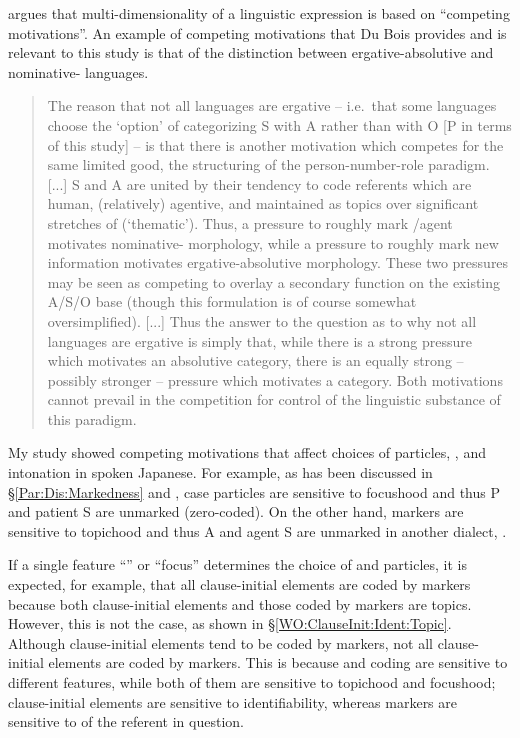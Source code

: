  argues that multi-dimensionality of a linguistic expression is based on ``competing motivations''.
An example of competing motivations that Du Bois provides and is relevant to this study is
that of the distinction between ergative-absolutive and nominative- languages.
%
\begin{quote}
The reason that not all languages are ergative -- i.e.~that some languages choose the `option' of categorizing S with A rather than with O [P in terms of this study] -- 
is that there is another motivation which competes for the same limited good,
the structuring of the person-number-role paradigm. [...]
S and A are united by their tendency to code referents which are human,
(relatively) agentive, and maintained as topics over significant stretches of  (`thematic').
Thus, a  pressure to roughly mark /agent motivates nominative- morphology,
while a  pressure to roughly mark new information motivates ergative-absolutive morphology.
These two pressures may be seen as competing to overlay a secondary function on the existing A/S/O base (though this formulation is of course somewhat oversimplified). [...]
Thus the answer to the question as to why not all languages are ergative is simply that,
while there is a strong  pressure which motivates an absolutive category, there is an equally strong -- possibly stronger --
 pressure which motivates a  category.
Both motivations cannot prevail in the competition for control of the linguistic substance of this paradigm.
\cite[354--355]{dubois85}
\end{quote}
%
My study showed competing motivations that affect
choices of particles, , and intonation in spoken Japanese.
For example,
as has been discussed in \S \ref{Par:Dis:Markedness} and ,
case particles are sensitive to focushood and thus
P and patient S are unmarked (zero-coded).
On the other hand,  markers are sensitive to topichood and thus
A and agent S are unmarked in another dialect, .

If a single feature ``'' or ``focus'' determines the choice of  and particles,
it is expected, for example, that
all clause-initial elements are coded by  markers
because both clause-initial elements and those coded by  markers are topics.
However, this is not the case,
as shown in \S \ref{WO:ClauseInit:Ident:Topic}.
Although clause-initial elements tend to be coded by  markers,
not all clause-initial elements are coded by  markers.
This is because  and  coding are sensitive to different features, while both of them are sensitive to topichood and focushood; clause-initial elements are sensitive to identifiability,
whereas  markers are sensitive to  of the referent in question.


